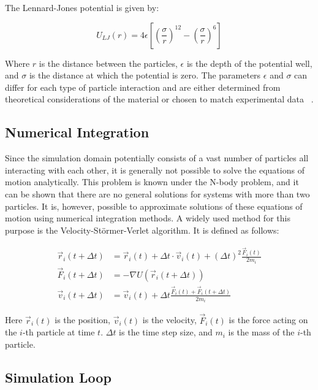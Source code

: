 The Lennard-Jones potential is given by:

\begin{equation}
      U_{LJ}(r) = 4 \epsilon \left[ \left( \frac{\sigma}{r} \right)^{12} - \left( \frac{\sigma}{r} \right)^6 \right]
\end{equation}


Where $r$ is the distance between the particles, $\epsilon$ is the depth of the potential well, and $\sigma$ is the distance at which the potential is zero. The parameters $\epsilon$ and $\sigma$ can differ for each type of particle interaction and are either determined from theoretical considerations of the material or chosen to match experimental data~\cite{Maghfiroh2020} \cite{Irikura2021}.


\subsection{Numerical Integration}

Since the simulation domain potentially consists of a vast number of particles all interacting with each other, it is generally not possible to solve the equations of motion analytically. This problem is known under the N-body problem, and it can be shown that there are no general solutions for systems with more than two particles. It is, however, possible to approximate solutions of these equations of motion using numerical integration methods. A widely used method for this purpose is the Velocity-Störmer-Verlet algorithm. It is defined as follows:

\begin{align}
      \vec{r}_i(t + \Delta t) & = \vec{r}_i(t) + \Delta t \cdot \vec{v}_i(t) + (\Delta t)^2 \frac{\vec{F}_i(t)}{2m_i} \label{eq:verlet_position} \\
      \vec{F}_i(t + \Delta t) & = -\nabla U (\vec{r}_i(t + \Delta t)) \label{eq:verlet_force}                                                    \\
      \vec{v}_i(t + \Delta t) & = \vec{v}_i(t) + \Delta t  \frac{\vec{F}_i(t) + \vec{F}_i(t + \Delta t)}{2m_i} \label{eq:verlet_velocity}
\end{align}

Here $\vec{r}_i(t)$ is the position, $\vec{v}_i(t)$ is the velocity, $\vec{F}_i(t)$ is the force acting on the $i$-th particle at time $t$. $\Delta t$ is the time step size, and $m_i$ is the mass of the $i$-th particle.

\subsection{Simulation Loop}

